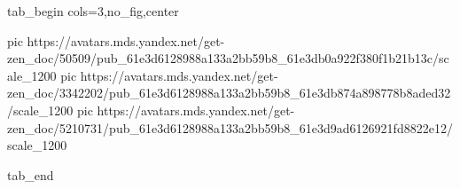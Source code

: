  
 
 
 
 


\ifcmt
  tab_begin cols=3,no_fig,center

     pic https://avatars.mds.yandex.net/get-zen_doc/50509/pub_61e3d6128988a133a2bb59b8_61e3db0a922f380f1b21b13c/scale_1200
		 pic https://avatars.mds.yandex.net/get-zen_doc/3342202/pub_61e3d6128988a133a2bb59b8_61e3db874a898778b8aded32/scale_1200
		 pic https://avatars.mds.yandex.net/get-zen_doc/5210731/pub_61e3d6128988a133a2bb59b8_61e3d9ad6126921fd8822e12/scale_1200

  tab_end
\fi
